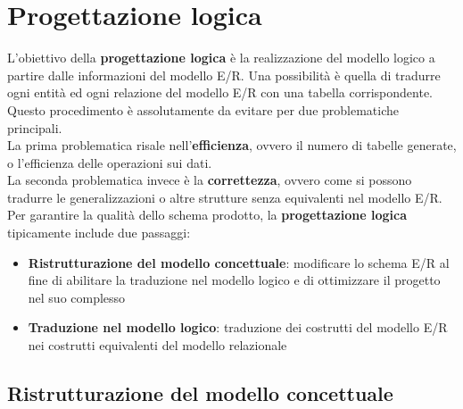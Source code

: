 \documentclass{article}
\begin{document}
\pagestyle{empty}

\section*{Progettazione logica} 
\large

L'obiettivo della \textbf{progettazione logica} è la realizzazione del modello logico a partire dalle informazioni del modello E/R. Una possibilità è quella di tradurre ogni entità ed ogni relazione del modello E/R con una tabella corrispondente. Questo procedimento è assolutamente da evitare per due problematiche principali.\\
La prima problematica risale nell'\textbf{efficienza}, ovvero il numero di tabelle generate, o l'efficienza delle operazioni sui dati.\\
La seconda problematica invece è la \textbf{correttezza}, ovvero come si possono tradurre le generalizzazioni o altre strutture senza equivalenti nel modello E/R.\vspace*{14pt}\\
Per garantire la qualità dello schema prodotto, la \textbf{progettazione logica} tipicamente include due passaggi:
\begin{itemize}[label={-}, leftmargin=1cm]
    \itemsep0em
    \item \textbf{Ristrutturazione del modello concettuale}: modificare lo schema E/R al fine di abilitare la traduzione nel modello logico e di ottimizzare il progetto nel suo complesso
    \item \textbf{Traduzione nel modello logico}: traduzione dei costrutti del modello E/R nei costrutti equivalenti del modello relazionale
\end{itemize}

\subsection*{Ristrutturazione del modello concettuale}
\large
\end{document}
